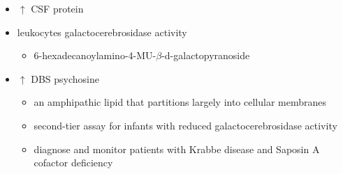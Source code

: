 \documentclass[12pt]{scrartcl}
\begin{document}
\begin{itemize}
\item \(\uparrow\) CSF protein
\item leukocytes galactocerebrosidase activity 
\begin{itemize}
\item 6-hexadecanoylamino-4-MU-\(\beta\)-d-galactopyranoside
\end{itemize}

\item \(\uparrow\) DBS psychosine
\begin{itemize}
\item an amphipathic lipid that partitions largely into cellular
membranes
\item second-tier assay for infants with reduced galactocerebrosidase activity
\item diagnose and monitor patients with Krabbe disease and Saposin A
cofactor deficiency
\end{itemize}
\end{itemize}
\end{document}
